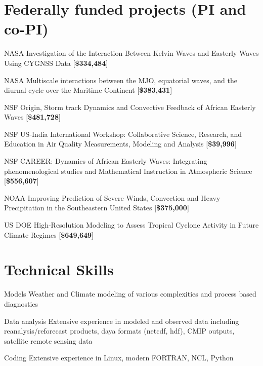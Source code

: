\section*{Federally funded projects (PI and co-PI)}
\begin{tlist}
\item[NASA] Investigation of the Interaction Between Kelvin Waves and Easterly Waves Using CYGNSS Data  [{\bf \$334,484}]
        \vspace{2mm}

\item[NASA] Multiscale interactions between the MJO, equatorial waves, and the diurnal cycle over the Maritime Continent [{\bf\$383,431}]
              \vspace{2mm}

\item[NSF]  Origin, Storm track Dynamics and Convective Feedback of African Easterly Waves [{\bf \$481,728}]
               \vspace{2mm}

\item[NSF]  US-India International Workshop: Collaborative Science, Research, and Education in Air Quality Measurements, Modeling and Analysis [{\bf \$39,996}]
               \vspace{2mm}

\item[NSF]  CAREER: Dynamics of African Easterly Waves: Integrating phenomenological studies and Mathematical Instruction in Atmospheric Science [{\bf \$556,607}]
               \vspace{2mm}

\item[NOAA] Improving Prediction of Severe Winds, Convection and Heavy Precipitation in the Southeastern United States [{\bf\$375,000}]
               \vspace{2mm}

\item[US DOE] High-Resolution Modeling to Assess Tropical Cyclone Activity in Future Climate Regimes [{\bf\$649,649}]
\end{tlist}


\section*{Technical Skills}
\begin{tlist}
\item[Models]   Weather and Climate modeling of various complexities and process based diagnostics
  
\item[Data analysis]  Extensive experience in  modeled and observed data including reanalysis/reforecast products, daya formats (netcdf, hdf), CMIP outputs, satellite remote sensing data
  
\item[Coding]    Extensive experience in Linux,  modern FORTRAN, NCL, Python
   

\end{tlist}
